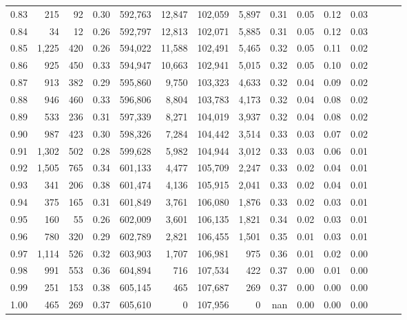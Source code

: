 \begin{tabular}{rrrrrrrrrrrrrrr}
0.83 &     215 &     92 &  0.30 &  592,763 &   12,847 &  102,059 &    5,897 &  0.31 &  0.05 &  0.12 &      0.03 \\
0.84 &      34 &     12 &  0.26 &  592,797 &   12,813 &  102,071 &    5,885 &  0.31 &  0.05 &  0.12 &      0.03 \\
0.85 &   1,225 &    420 &  0.26 &  594,022 &   11,588 &  102,491 &    5,465 &  0.32 &  0.05 &  0.11 &      0.02 \\
0.86 &     925 &    450 &  0.33 &  594,947 &   10,663 &  102,941 &    5,015 &  0.32 &  0.05 &  0.10 &      0.02 \\
0.87 &     913 &    382 &  0.29 &  595,860 &    9,750 &  103,323 &    4,633 &  0.32 &  0.04 &  0.09 &      0.02 \\
0.88 &     946 &    460 &  0.33 &  596,806 &    8,804 &  103,783 &    4,173 &  0.32 &  0.04 &  0.08 &      0.02 \\
0.89 &     533 &    236 &  0.31 &  597,339 &    8,271 &  104,019 &    3,937 &  0.32 &  0.04 &  0.08 &      0.02 \\
0.90 &     987 &    423 &  0.30 &  598,326 &    7,284 &  104,442 &    3,514 &  0.33 &  0.03 &  0.07 &      0.02 \\
0.91 &   1,302 &    502 &  0.28 &  599,628 &    5,982 &  104,944 &    3,012 &  0.33 &  0.03 &  0.06 &      0.01 \\
0.92 &   1,505 &    765 &  0.34 &  601,133 &    4,477 &  105,709 &    2,247 &  0.33 &  0.02 &  0.04 &      0.01 \\
0.93 &     341 &    206 &  0.38 &  601,474 &    4,136 &  105,915 &    2,041 &  0.33 &  0.02 &  0.04 &      0.01 \\
0.94 &     375 &    165 &  0.31 &  601,849 &    3,761 &  106,080 &    1,876 &  0.33 &  0.02 &  0.03 &      0.01 \\
0.95 &     160 &     55 &  0.26 &  602,009 &    3,601 &  106,135 &    1,821 &  0.34 &  0.02 &  0.03 &      0.01 \\
0.96 &     780 &    320 &  0.29 &  602,789 &    2,821 &  106,455 &    1,501 &  0.35 &  0.01 &  0.03 &      0.01 \\
0.97 &   1,114 &    526 &  0.32 &  603,903 &    1,707 &  106,981 &      975 &  0.36 &  0.01 &  0.02 &      0.00 \\
0.98 &     991 &    553 &  0.36 &  604,894 &      716 &  107,534 &      422 &  0.37 &  0.00 &  0.01 &      0.00 \\
0.99 &     251 &    153 &  0.38 &  605,145 &      465 &  107,687 &      269 &  0.37 &  0.00 &  0.00 &      0.00 \\
1.00 &     465 &    269 &  0.37 &  605,610 &        0 &  107,956 &        0 &   nan &  0.00 &  0.00 &      0.00 \\
\bottomrule
\end{tabular}
